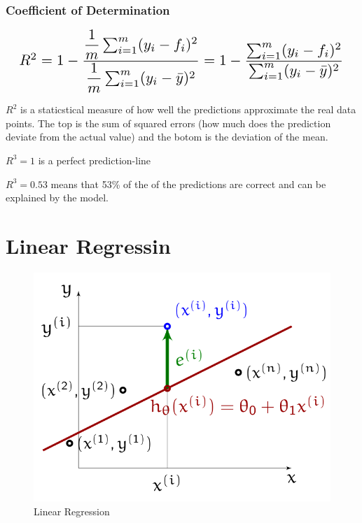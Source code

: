\documentclass[a4paper, 11pt]{article}
\begin{document}
\subsubsection{Coefficient of Determination} \label{sec:r_squared}

\[\scalebox{1.5}{
        $R^2 = 1- \dfrac{\dfrac{1}{m} \sum^{m}_{i=1}(y_{i} - f_{i})^2}{\dfrac{1}{m} \sum^{m}_{i=1}(y_{i} - \bar{y})^2} =1 - \dfrac{\sum^{m}_{i=1}(y_{i} - f_{i})^2}{\sum^{m}_{i=1}(y_{i} - \bar{y})^2} $
}\]

$R^2$ is a staticstical measure of how well the predictions approximate the real data points. 
The top is the sum of squared errors (how much does the prediction deviate from the actual value) and the botom is the deviation of the mean.

$R^3 = 1$ is a perfect prediction-line

$R^3 = 0.53$ means that 53\% of the of the predictions are correct and can be explained by the model.

\newpage

\section{Linear Regressin}

\begin{figure}
    \centering
    \includegraphics[keepaspectratio=true,height=14\baselineskip]{linear_regression.png}
    \caption{Linear Regression}
    \label{fig:linear_regression}
\end{figure}
\end{document}
